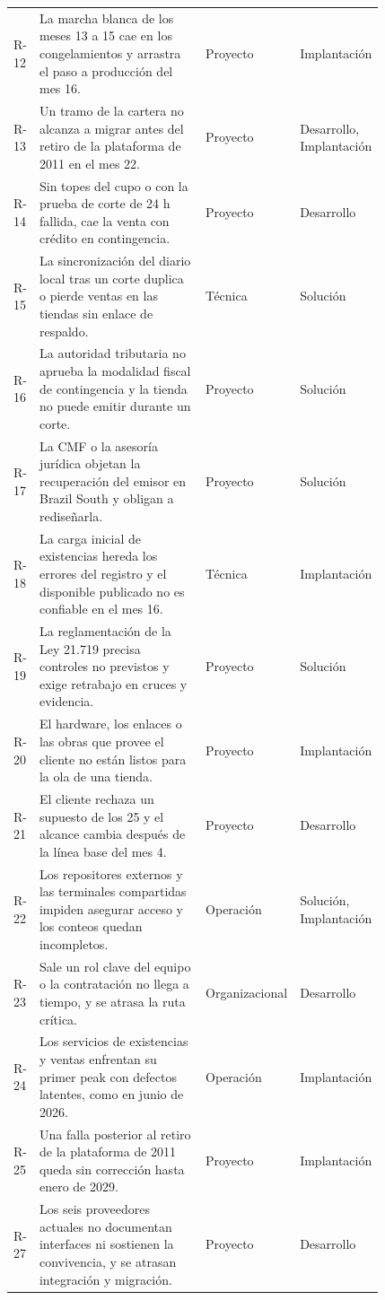 \documentclass[11pt]{article}
\begin{document}
\begin{longtable}{p{0.060\linewidth}p{0.470\linewidth}p{0.140\linewidth}p{0.150\linewidth}}
R-12 & La marcha blanca de los meses 13 a 15 cae en los congelamientos y arrastra el paso a producción del mes 16. & Proyecto & Implantación \\
R-13 & Un tramo de la cartera no alcanza a migrar antes del retiro de la plataforma de 2011 en el mes 22. & Proyecto & Desarrollo, Implantación \\
R-14 & Sin topes del cupo o con la prueba de corte de 24 h fallida, cae la venta con crédito en contingencia. & Proyecto & Desarrollo \\
R-15 & La sincronización del diario local tras un corte duplica o pierde ventas en las tiendas sin enlace de respaldo. & Técnica & Solución \\
R-16 & La autoridad tributaria no aprueba la modalidad fiscal de contingencia y la tienda no puede emitir durante un corte. & Proyecto & Solución \\
R-17 & La CMF o la asesoría jurídica objetan la recuperación del emisor en Brazil South y obligan a rediseñarla. & Proyecto & Solución \\
R-18 & La carga inicial de existencias hereda los errores del registro y el disponible publicado no es confiable en el mes 16. & Técnica & Implantación \\
R-19 & La reglamentación de la Ley 21.719 precisa controles no previstos y exige retrabajo en cruces y evidencia. & Proyecto & Solución \\
R-20 & El hardware, los enlaces o las obras que provee el cliente no están listos para la ola de una tienda. & Proyecto & Implantación \\
R-21 & El cliente rechaza un supuesto de los 25 y el alcance cambia después de la línea base del mes 4. & Proyecto & Desarrollo \\
R-22 & Los repositores externos y las terminales compartidas impiden asegurar acceso y los conteos quedan incompletos. & Operación & Solución, Implantación \\
R-23 & Sale un rol clave del equipo o la contratación no llega a tiempo, y se atrasa la ruta crítica. & Organizacional & Desarrollo \\
R-24 & Los servicios de existencias y ventas enfrentan su primer peak con defectos latentes, como en junio de 2026. & Operación & Implantación \\
R-25 & Una falla posterior al retiro de la plataforma de 2011 queda sin corrección hasta enero de 2029. & Proyecto & Implantación \\
R-27 & Los seis proveedores actuales no documentan interfaces ni sostienen la convivencia, y se atrasan integración y migración. & Proyecto & Desarrollo \\

\end{longtable}
\end{document}
